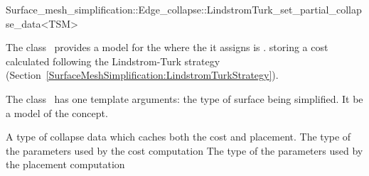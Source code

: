 

\begin{ccRefClass}{Surface_mesh_simplification::Edge_collapse::LindstromTurk_set_partial_collapse_data<TSM>}


\ccDefinition

The class \ccRefName\ provides a model for the
 where the  it assigns is .
storing a cost calculated following the Lindstrom-Turk strategy
(Section~\ref{SurfaceMeshSimplification:LindstromTurkStrategy}).

The class \ccRefName\ has one template arguments: the type of surface being simplified. 
It be a model of the  concept.

\ccIsModel
{}


\ccTypes
  \ccGlue
  \ccGlue
  {A type of collapse data which caches both the cost and placement.}
  \ccGlue
  {The type of the parameters used by the cost computation}
  \ccGlue
  {The type of the parameters used by the placement computation}
            

\end{ccRefClass}
